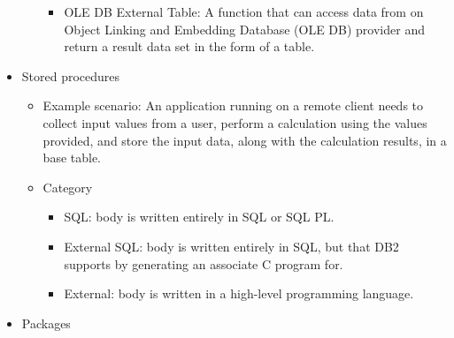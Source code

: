 \documentclass{article}
\begin{document}
\begin{itemize}
\begin{itemize}
\begin{itemize}
			\item OLE DB External Table: A function that can access data from on Object Linking and 
				Embedding Database (OLE DB) provider and return a result data set in the form of a table.
		\end{itemize}
	\end{itemize}
\item Stored procedures
	\begin{itemize}
		\item Example scenario: An application running on a remote client needs to collect input values from a user, 
		perform a calculation using the values provided, and store the input data, along with the calculation
		results, in a base table.
		\item Category
		\begin{itemize}
			\item SQL: body is written entirely in SQL or SQL PL.
			\item {\color{red}External SQL}: body is written entirely in SQL, but that DB2 supports by generating 
				an associate C program for.
			\item External: body is written in a high-level programming language.
		\end{itemize}
	\end{itemize}
\item Packages
\end{itemize}
\end{document}
